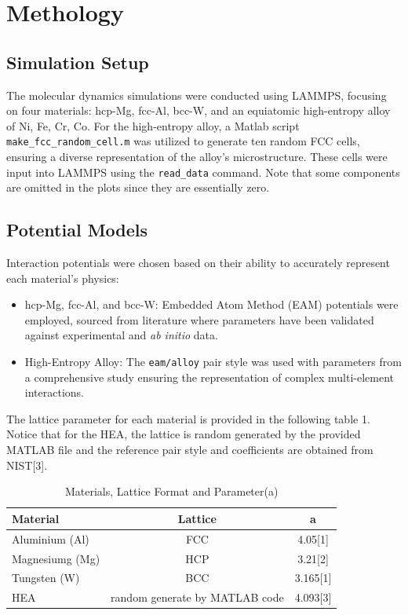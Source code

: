 \documentclass[a4paper,11pt]{article} %
\begin{document}
\section*{Methology}
\subsection*{Simulation Setup}
The molecular dynamics simulations were conducted using LAMMPS, focusing on four materials: hcp-Mg, fcc-Al, bcc-W, and an equiatomic high-entropy alloy of Ni, Fe, Cr, Co. For the high-entropy alloy, a Matlab script \texttt{make\_fcc\_random\_cell.m} was utilized to generate ten random FCC cells, ensuring a diverse representation of the alloy's microstructure. These cells were input into LAMMPS using the \texttt{read\_data} command.
Note that some components are omitted in the plots since they are essentially zero.
\subsection*{Potential Models}
Interaction potentials were chosen based on their ability to accurately represent each material's physics:
\begin{itemize}
    \item hcp-Mg, fcc-Al, and bcc-W: Embedded Atom Method (EAM) potentials were employed, sourced from literature where parameters have been validated against experimental and \textit{ab initio} data.
    \item High-Entropy Alloy: The \texttt{eam/alloy} pair style was used with parameters from a comprehensive study ensuring the representation of complex multi-element interactions.
\end{itemize}
The lattice parameter for each material is provided in the following table 1. Notice that for the HEA, the lattice is random generated by the provided MATLAB file and the reference pair style and coefficients are obtained from NIST[3].
\begin{table}[ht]
    \caption{Materials, Lattice Format and Parameter(a) }
    \centering
    \begin{tabular}{|l|c|c|}
        \hline
        Material & Lattice &a \\
        \hline   
        Aluminium (Al) & FCC & 4.05[1] \\
        Magnesiumg (Mg)& HCP & 3.21[2]\\
        Tungsten (W) & BCC & 3.165[1]\\
        HEA & random generate by MATLAB code & 4.093[3] \\
        \hline
    \end{tabular}
\end{table}
\end{document}
